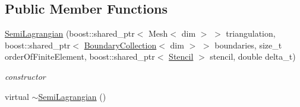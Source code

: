 \subsection*{Public Member Functions}
\begin{DoxyCompactItemize}
\item 
\hyperlink{classnatrium_1_1SemiLagrangian_ae6ef291c9cd0579ebb5889b271d64123}{SemiLagrangian} (boost::shared\_\-ptr$<$ Mesh$<$ dim $>$ $>$ triangulation, boost::shared\_\-ptr$<$ \hyperlink{classnatrium_1_1BoundaryCollection}{BoundaryCollection}$<$ dim $>$ $>$ boundaries, size\_\-t orderOfFiniteElement, boost::shared\_\-ptr$<$ \hyperlink{classnatrium_1_1Stencil}{Stencil} $>$ stencil, double delta\_\-t)
\begin{DoxyCompactList}\small\item\em constructor \item\end{DoxyCompactList}\item 
\hypertarget{classnatrium_1_1SemiLagrangian_a6c0ebcd2055e6608cc6f280a89ea43a3}{
virtual \hyperlink{classnatrium_1_1SemiLagrangian_a6c0ebcd2055e6608cc6f280a89ea43a3}{$\sim$SemiLagrangian} ()}
\label{classnatrium_1_1SemiLagrangian_a6c0ebcd2055e6608cc6f280a89ea43a3}


\end{DoxyCompactItemize}
